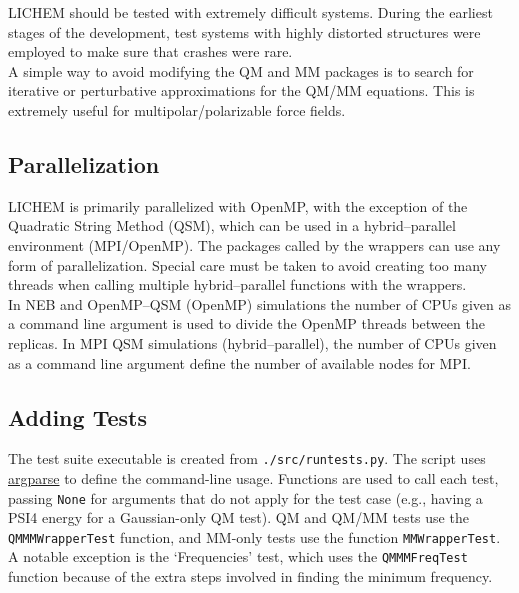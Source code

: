 \documentclass[12pt]{report}
\begin{document}


LICHEM should be tested with extremely difficult systems.
During the earliest stages of the development, test systems with highly
distorted structures were employed to make sure that crashes were rare. \\

A simple way to avoid modifying the QM and MM packages is to search for
iterative or perturbative approximations for the QM/MM equations.
This is extremely useful for multipolar/polarizable force fields.

\subsection{Parallelization}

LICHEM is primarily parallelized with OpenMP, with the exception
of the Quadratic String Method (QSM), which can be used in a
hybrid--parallel environment (MPI/OpenMP).  The packages called by the
wrappers can use any form of parallelization.
Special care must be taken to avoid creating too many threads when calling
multiple hybrid--parallel functions with the wrappers. \\

In NEB and OpenMP--QSM (OpenMP) simulations the number of CPUs given as a
command line argument is used to divide the OpenMP threads between the replicas.
In MPI QSM simulations (hybrid--parallel), the number of CPUs given as a
command line argument define the number of available nodes for MPI.

\subsection{Adding Tests}

The test suite executable is created from \texttt{./src/runtests.py}.
The script uses
\href{https://docs.python.org/3.10/library/argparse.html}{argparse}
to define the command-line usage.
Functions are used to call each test, passing \texttt{None} for 
arguments that do not apply for the test case (e.g., having a 
PSI4 energy for a Gaussian-only QM test).
QM and QM/MM tests use the \texttt{QMMMWrapperTest} function, 
and MM-only tests use the function \texttt{MMWrapperTest}.
A notable exception is the `Frequencies' test, which uses the 
\texttt{QMMMFreqTest} function because of the extra steps involved
in finding the minimum frequency. \\
\end{document}
